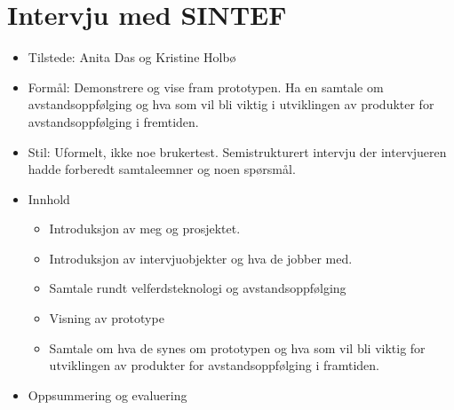\section{Intervju med SINTEF}\label{intervju-med-sintef}

\begin{itemize}
\tightlist
\item
  Tilstede: Anita Das og Kristine Holbø
\item
  Formål: Demonstrere og vise fram prototypen. Ha en samtale om
  avstandsoppfølging og hva som vil bli viktig i utviklingen av
  produkter for avstandsoppfølging i fremtiden.
\item
  Stil: Uformelt, ikke noe brukertest. Semistrukturert intervju der
  intervjueren hadde forberedt samtaleemner og noen spørsmål.
\item
  Innhold

  \begin{itemize}
  \tightlist
  \item
    Introduksjon av meg og prosjektet.
  \item
    Introduksjon av intervjuobjekter og hva de jobber med.
  \item
    Samtale rundt velferdsteknologi og avstandsoppfølging
  \item
    Visning av prototype
  \item
    Samtale om hva de synes om prototypen og hva som vil bli viktig for
    utviklingen av produkter for avstandsoppfølging i framtiden.
  \end{itemize}
\item
  Oppsummering og evaluering


\end{itemize}
